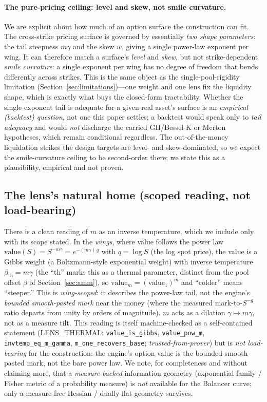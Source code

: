 \documentclass[11pt]{article}
\newcommand{\tfp}{\emph{trusted-from-prover}}
\begin{document}
\paragraph{The pure-pricing ceiling: level and skew, not smile curvature.}
We are explicit about how much of an option surface the construction can fit. The
cross-strike pricing surface is governed by essentially \emph{two shape
parameters}: the tail steepness $m\gamma$ and the skew $w$, giving a single
power-law exponent per wing. It can therefore match a surface's \emph{level} and
\emph{skew}, but not strike-dependent \emph{smile curvature}: a single exponent
per wing has no degree of freedom that bends differently across strikes. This is
the same object as the single-pool-rigidity limitation
(Section~\ref{sec:limitations})---one weight and one lens fix the liquidity shape,
which is exactly what buys the closed-form tractability. Whether the
single-exponent tail is adequate for a given real asset's surface is an
\emph{empirical (backtest) question}, not one this paper settles; a backtest would
speak only to \emph{tail adequacy} and would \emph{not} discharge the carried
GH/Bessel-K or Merton hypotheses, which remain conditional regardless. The
out-of-the-money liquidation strikes the design targets are level- and
skew-dominated, so we expect the smile-curvature ceiling to be second-order there;
we state this as a plausibility, empirical and not proven.

\subsection{The lens's natural home (scoped reading, not load-bearing)}
\label{sec:gibbs}
There is a clean reading of $m$ as an inverse temperature, which we include only
with its scope stated. In the \emph{wings}, where value follows the power law
$\mathrm{value}(S)=S^{-m\gamma}=e^{-(m\gamma)\,q}$ with $q=\log S$ (the log spot
price), the value is a Gibbs weight (a Boltzmann-style exponential weight) with
inverse temperature $\beta_{\mathrm{th}}=m\gamma$ (the ``$\mathrm{th}$'' marks this
as a thermal parameter, distinct from the pool offset $\beta$ of
Section~\ref{sec:amm}), so
$\mathrm{value}_{m}=(\mathrm{value}_{1})^{m}$ and ``colder'' means ``steeper.''
This is \emph{wing-scoped}: it describes the power-law tail, not the engine's
\emph{bounded smooth-pasted mark} near the money (where the measured
mark-to-$S^{-g}$ ratio departs from unity by orders of magnitude). $m$ acts as a
dilation $\gamma\mapsto m\gamma$, not as a measure tilt. This reading is itself
machine-checked as a self-contained statement (LENS\_THERMAL:
\texttt{value\_is\_gibbs}, \texttt{value\_pow\_m},
\texttt{invtemp\_eq\_m\_gamma}, \texttt{m\_one\_recovers\_base}; \tfp{}) but is
\emph{not load-bearing} for the construction: the engine's option value is the
bounded smooth-pasted mark, not the bare power law. We note, for completeness and
without claiming more, that a \emph{measure-backed} information geometry
(exponential family / Fisher metric of a probability measure) is \emph{not}
available for the Balancer curve; only a measure-free Hessian / dually-flat
geometry survives.
\end{document}
